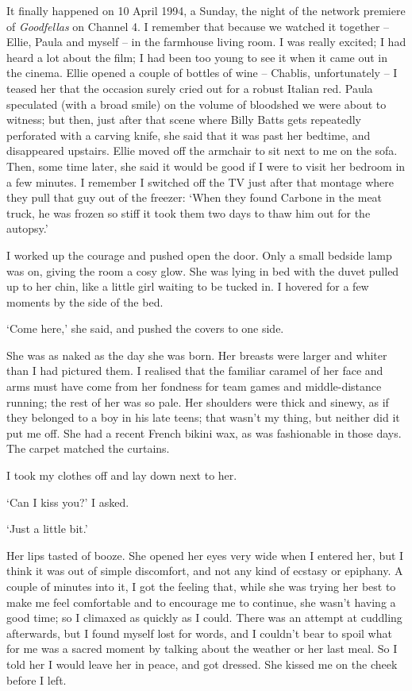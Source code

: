 It finally happened on 10 April 1994, a Sunday, the night of the network premiere of \textit{Goodfellas} on Channel 4. I remember that because we watched it together -- Ellie, Paula and myself -- in the farmhouse living room. I was really excited; I had heard a lot about the film; I had been too young to see it when it came out in the cinema. Ellie opened a couple of bottles of wine -- Chablis, unfortunately -- I teased her that the occasion surely cried out for a robust Italian red. Paula speculated (with a broad smile) on the volume of bloodshed we were about to witness; but then, just after that scene where Billy Batts gets repeatedly perforated with a carving knife, she said that it was past her bedtime, and disappeared upstairs. Ellie moved off the armchair to sit next to me on the sofa. Then, some time later, she said it would be good if I were to visit her bedroom in a few minutes. I remember I switched off the TV just after that montage where they pull that guy out of the freezer: `When they found Carbone in the meat truck, he was frozen so stiff it took them two days to thaw him out for the autopsy.'

I worked up the courage and pushed open the door. Only a small bedside lamp was on, giving the room a cosy glow. She was lying in bed with the duvet pulled up to her chin, like a little girl waiting to be tucked in. I hovered for a few moments by the side of the bed.

`Come here,' she said, and pushed the covers to one side.

She was as naked as the day she was born. Her breasts were larger and whiter than I had pictured them. I realised that the familiar caramel of her face and arms must have come from her fondness for team games and middle-distance running; the rest of her was so pale. Her shoulders were thick and sinewy, as if they belonged to a boy in his late teens; that wasn't my thing, but neither did it put me off. She had a recent French bikini wax, as was fashionable in those days. The carpet matched the curtains.

I took my clothes off and lay down next to her.

`Can I kiss you?' I asked.

`Just a little bit.'

Her lips tasted of booze. She opened her eyes very wide when I entered her, but I think it was out of simple discomfort, and not any kind of ecstasy or epiphany. A couple of minutes into it, I got the feeling that, while she was trying her best to make me feel comfortable and to encourage me to continue, she wasn't having a good time; so I climaxed as quickly as I could. There was an attempt at cuddling afterwards, but I found myself lost for words, and I couldn't bear to spoil what for me was a sacred moment by talking about the weather or her last meal. So I told her I would leave her in peace, and got dressed. She kissed me on the cheek before I left.

